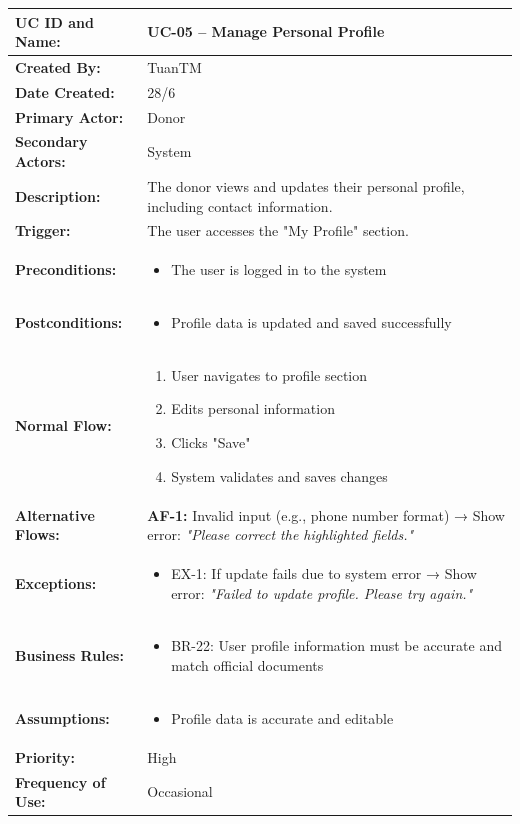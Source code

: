 \documentclass[12pt,a4paper]{article}
\begin{document}
\renewcommand{\arraystretch}{1.5}
\begin{longtable}{|p{4.5cm}|p{10.5cm}|}
\hline
\textbf{UC ID and Name:} & UC-05 – Manage Personal Profile \\
\hline
\textbf{Created By:} & TuanTM \\
\hline
\textbf{Date Created:} & 28/6 \\
\hline
\textbf{Primary Actor:} & Donor \\
\hline
\textbf{Secondary Actors:} & System \\
\hline
\textbf{Description:} & The donor views and updates their personal profile, including contact information. \\
\hline
\textbf{Trigger:} & The user accesses the "My Profile" section. \\
\hline
\textbf{Preconditions:} &
\begin{itemize}
  \item The user is logged in to the system
\end{itemize} \\
\hline
\textbf{Postconditions:} &
\begin{itemize}
  \item Profile data is updated and saved successfully
\end{itemize} \\
\hline
\textbf{Normal Flow:} &
\begin{enumerate}
  \item User navigates to profile section
  \item Edits personal information
  \item Clicks "Save"
  \item System validates and saves changes
\end{enumerate} \\
\hline
\textbf{Alternative Flows:} &
\textbf{AF-1:} Invalid input (e.g., phone number format) → Show error: \textit{"Please correct the highlighted fields."} \\
\hline
\textbf{Exceptions:} &
\begin{itemize}
  \item EX-1: If update fails due to system error → Show error: \textit{"Failed to update profile. Please try again."}
\end{itemize} \\
\hline
\textbf{Business Rules:} &
\begin{itemize}
  \item BR-22: User profile information must be accurate and match official documents
\end{itemize} \\
\hline
\textbf{Assumptions:} &
\begin{itemize}
  \item Profile data is accurate and editable
\end{itemize} \\
\hline
\textbf{Priority:} & High \\
\hline
\textbf{Frequency of Use:} & Occasional \\
\hline
\end{longtable}
\end{document}
